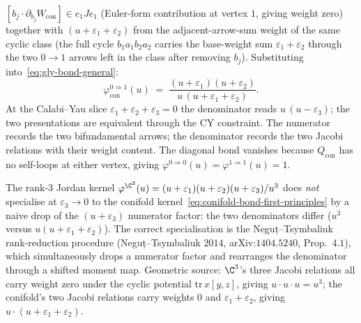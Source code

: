 \begin{proposition}
$[b_j \cdot \partial_{b_j} W_{\mathrm{con}}] \in e_1 J e_1$ (Euler-form
contribution at vertex $1$, giving weight zero) together with
$(u + \varepsilon_1 + \varepsilon_2)$ from the adjacent-arrow-sum
weight of the same cyclic class (the full cycle $b_1 a_1 b_2 a_2$
carries the base-weight sum $\varepsilon_1 + \varepsilon_2$ through
the two $0 \to 1$ arrows left in the class after removing $b_j$).
Substituting into~\eqref{eq:gly-bond-general}:
\begin{equation}
\label{eq:conifold-bond-first-principles}
 \varphi^{0 \Rightarrow 1}_{\mathrm{con}}(u)
 \;=\;
 \frac{(u + \varepsilon_1)(u + \varepsilon_2)}{u\,(u + \varepsilon_1 + \varepsilon_2)}.
\end{equation}
At the Calabi--Yau slice $\varepsilon_1 + \varepsilon_2 + \varepsilon_3
= 0$ the denominator reads $u\,(u - \varepsilon_3)$; the two presentations
are equivalent through the CY constraint. The numerator records the
two bifundamental arrows; the denominator records the two Jacobi
relations with their weight content. The diagonal bond vanishes
because $Q_{\mathrm{con}}$ has no self-loops at either vertex, giving
$\varphi^{0 \Rightarrow 0}(u) = \varphi^{1 \Rightarrow 1}(u) = 1$.
\end{proposition}

\begin{remark}
\label{rem:conifold-bond-rank-reduction}
The rank-$3$ Jordan kernel $\varphi^{\C^3}(u) = (u + \varepsilon_1)(u + \varepsilon_2)(u + \varepsilon_3) / u^3$ does \emph{not} specialise at $\varepsilon_3 \to 0$ to the conifold kernel~\eqref{eq:conifold-bond-first-principles} by a naive drop of the $(u + \varepsilon_3)$ numerator factor: the two denominators differ ($u^3$ versus $u (u + \varepsilon_1 + \varepsilon_2)$). The correct specialisation is the Neguț--Tsymbaliuk rank-reduction procedure (Neguț--Tsymbaliuk $2014$, arXiv:$1404.5240$, Prop.~$4.1$), which simultaneously drops a numerator factor and rearranges the denominator through a shifted moment map. Geometric source: $\C^3$'s three Jacobi relations all carry weight zero under the cyclic potential $\mathrm{tr}\,x[y, z]$, giving $u \cdot u \cdot u = u^3$; the conifold's two Jacobi relations carry weights $0$ and $\varepsilon_1 + \varepsilon_2$, giving $u \cdot (u + \varepsilon_1 + \varepsilon_2)$.
\end{remark}

